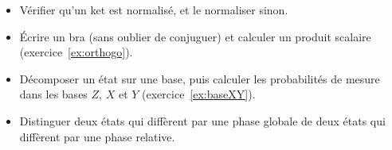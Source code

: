 \begin{savoirfaire}
\begin{itemize}
  \item Vérifier qu'un ket est normalisé, et le normaliser sinon.
  \item Écrire un bra (sans oublier de conjuguer) et calculer un produit scalaire
        (exercice~\ref{ex:orthogo}).
  \item Décomposer un état sur une base, puis calculer les probabilités de mesure dans les bases
        $Z$, $X$ et $Y$ (exercice~\ref{ex:baseXY}).
  \item Distinguer deux états qui diffèrent par une phase globale de deux états qui diffèrent par
        une phase relative.
\end{itemize}
\end{savoirfaire}
